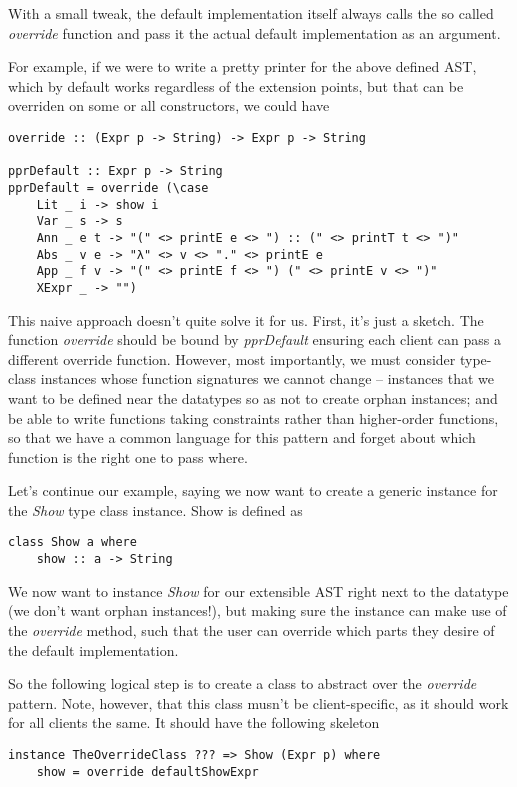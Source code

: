 \documentclass{article}
\begin{document}
With a small tweak, the default implementation itself always calls the
so called \emph{override} function and pass it the actual default implementation as
an argument.

For example, if we were to write a pretty printer for the above defined AST,
which by default works regardless of the extension points, but that can be
overriden on some or all constructors, we could have

\begin{lstlisting}
override :: (Expr p -> String) -> Expr p -> String

pprDefault :: Expr p -> String
pprDefault = override (\case 
    Lit _ i -> show i
    Var _ s -> s
    Ann _ e t -> "(" <> printE e <> ") :: (" <> printT t <> ")"
    Abs _ v e -> "λ" <> v <> "." <> printE e
    App _ f v -> "(" <> printE f <> ") (" <> printE v <> ")"
    XExpr _ -> "")
\end{lstlisting}

This naive approach doesn't quite solve it for us. First, it's just a sketch.
The function \emph{override} should be bound by \emph{pprDefault} ensuring each
client can pass a different override function. However, most importantly, we
must consider type-class instances whose function signatures we cannot change --
instances that we want to be defined near the datatypes so as not to create
orphan instances; and be able to write functions taking constraints rather than
higher-order functions, so that we have a common language for this pattern and
forget about which function is the right one to pass where.

Let's continue our example, saying we now want to create a generic instance for
the \emph{Show} type class instance. Show is defined as
\begin{lstlisting}
class Show a where
    show :: a -> String
\end{lstlisting}

We now want to instance \emph{Show} for our extensible AST right next to the
datatype (we don't want orphan instances!), but making sure the instance can
make use of the \emph{override} method, such that the user can override which
parts they desire of the default implementation.

So the following logical step is to create a class to abstract over the
\emph{override} pattern. Note, however, that this class musn't be
client-specific, as it should work for all clients the same. It should have the
following skeleton

\begin{lstlisting}
instance TheOverrideClass ??? => Show (Expr p) where
    show = override defaultShowExpr
\end{lstlisting}
\end{document}
